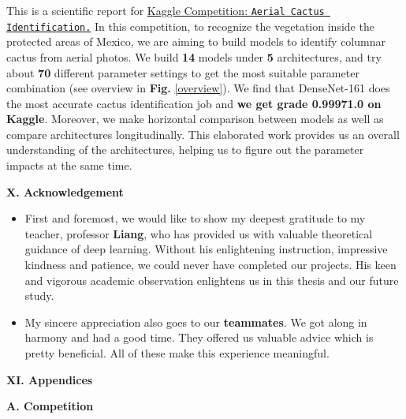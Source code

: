\documentclass[a4paper]{article}
\begin{document}
\large{This is a scientific report for \href{https://www.kaggle.com/c/aerial-cactus-identification/overview}{Kaggle Competition: \texttt{Aerial Cactus Identification.}} In this competition, to recognize the vegetation inside the protected areas of Mexico, we are aiming to build models to identify columnar cactus from aerial photos. We build \textbf{14} models under \textbf{5} architectures, and try about \textbf{70} different parameter settings to get the most suitable parameter combination (see overview in \textbf{Fig.} \ref{overview}). We find that \textsf{DenseNet-161} does the most accurate cactus identification job and \textbf{we get grade 0.9997\/1.0 on Kaggle}. Moreover, we make horizontal comparison between models as well as compare architectures longitudinally. This elaborated work provides us an overall understanding of the architectures, helping us to figure out the parameter impacts at the same time. }


\vspace{1.5cm}
\begin{center}
\LARGE\textbf{X. Acknowledgement} \\
\end{center}
\vspace{.5mm}

\begin{itemize} \item{First and foremost, we would like to show my deepest gratitude to my teacher, professor \textbf{Liang}, who has provided us with valuable theoretical guidance of deep learning. Without his enlightening instruction, impressive kindness and patience, we could never have completed our projects. His keen and vigorous academic observation enlightens us in this thesis and our future study.}
\item{My sincere appreciation also goes to our \textbf{teammates}. We got along in harmony and had a good time. They offered us valuable advice which is pretty beneficial. All of these make this experience meaningful.}
\end{itemize}

\clearpage
\vspace{5mm}
\begin{center}
\LARGE\textbf{XI. Appendices} \\
\end{center}

\vspace{5mm}
\begin{center}
\large\textbf{A. Competition} \\
\end{center}
\end{document}
